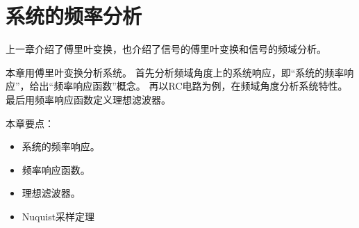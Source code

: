 \chapter{系统的频率分析}

上一章介绍了傅里叶变换，也介绍了信号的傅里叶变换和信号的频域分析。

本章用傅里叶变换分析系统。
首先分析频域角度上的系统响应，即“系统的频率响应”，给出“频率响应函数”概念。
再以RC电路为例，在频域角度分析系统特性。
最后用频率响应函数定义理想滤波器。

本章要点：
\begin{itemize}
    \item 系统的频率响应。
    \item 频率响应函数。
    \item 理想滤波器。
    \item Nuquist采样定理
\end{itemize}

\newpage


\newpage


\newpage


\newpage





